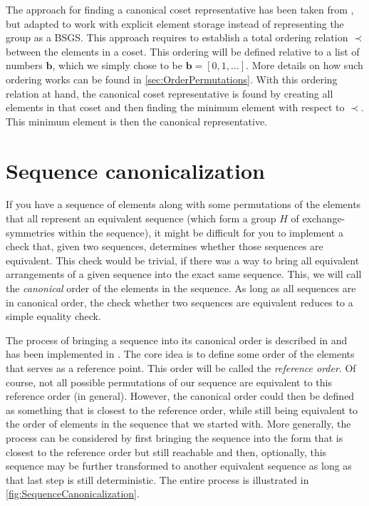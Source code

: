 \documentclass[parskip=half]{scrartcl}
\begin{document}
	The approach for finding a canonical coset representative has been taken from \textcite{Manssur2002a}, but adapted to work with explicit element
	storage instead of representing the group as a BSGS. This approach requires to establish a total ordering relation $\prec$ between the elements in
	a coset.\supercite{Manssur2002a} This ordering will be defined relative to a list of numbers $\mathbf{b}$, which we simply chose to be
	$\mathbf{b} = [ 0, 1, \ldots ]$. More details on how such ordering works can be found in \cref{sec:OrderPermutations}. With this ordering
	relation at hand, the canonical coset representative is found by creating all elements in that coset and then finding the minimum element with
	respect to $\prec$. This minimum element is then the canonical representative.


	\section{Sequence canonicalization}

	If you have a sequence of elements along with some permutations of the elements that all represent an equivalent sequence (which form a group $H$
	of exchange-symmetries within the sequence), it might be difficult for you to implement a check that, given two sequences, determines whether
	those sequences are equivalent. This check would be trivial, if there was a way to bring all equivalent arrangements of a given sequence into the
	exact same sequence. This, we will call the \emph{canonical} order of the elements in the sequence. As long as all sequences are in canonical
	order, the check whether two sequences are equivalent reduces to a simple equality check.

	The process of bringing a sequence into its canonical order is described in \textcite{Manssur2002a} and has been implemented in \libPerm{}. The
	core idea is to define some order of the elements that serves as a reference point. This order will be called the \emph{reference order}. Of
	course, not all possible permutations of our sequence are equivalent to this reference order (in general). However, the canonical order could then
	be defined as something that is closest to the reference order, while still being equivalent to the order of elements in the sequence that we
	started with. More generally, the process can be considered by first bringing the sequence into the form that is closest to the reference order
	but still reachable and then, optionally, this sequence may be further transformed to another equivalent sequence as long as that last step is
	still deterministic. The entire process is illustrated in \cref{fig:SequenceCanonicalization}.
\end{document}
